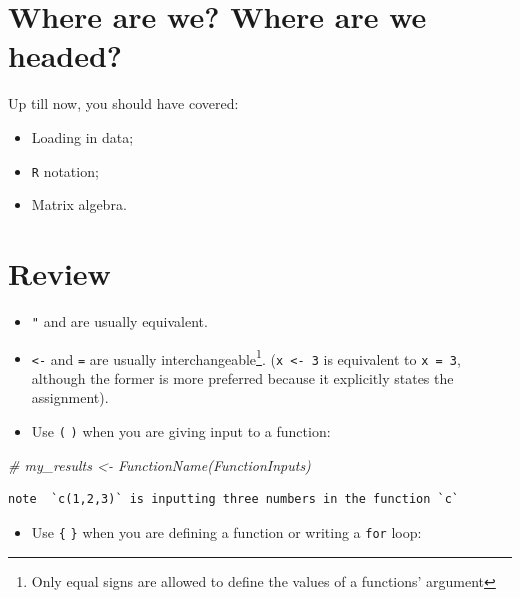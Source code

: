 \documentclass[
]{book}
\newenvironment{Shaded}{\begin{snugshade}}{\end{snugshade}}
\newcommand{\CommentTok}[1]{\textcolor[rgb]{0.56,0.35,0.01}{\textit{#1}}}
\providecommand{\tightlist}{%
  \setlength{\itemsep}{0pt}\setlength{\parskip}{0pt}}
\theoremstyle{definition}
\theoremstyle{definition}
\theoremstyle{definition}
\theoremstyle{remark}
\begin{document}
\hypertarget{where-are-we-where-are-we-headed-7}{%
\section*{Where are we? Where are we headed?}\label{where-are-we-where-are-we-headed-7}}

Up till now, you should have covered:

\begin{itemize}
\tightlist
\item
  Loading in data;
\item
  \texttt{R} notation;
\item
  Matrix algebra.
\end{itemize}

\hypertarget{review}{%
\section{Review}\label{review}}

\begin{itemize}
\tightlist
\item
  \texttt{"} and \texttt{\textquotesingle{}} are usually equivalent.
\item
  \texttt{\textless{}-} and \texttt{=} are usually interchangeable\footnote{Only equal signs are allowed to define the values of a functions' argument}. (\texttt{x\ \textless{}-\ 3} is equivalent to \texttt{x\ =\ 3}, although the former is more preferred because it explicitly states the assignment).
\item
  Use \texttt{(} \texttt{)} when you are giving input to a function:
\end{itemize}

\begin{Shaded}
\begin{Highlighting}[]
\CommentTok{\# my\_results <{-} FunctionName(FunctionInputs)}
\end{Highlighting}
\end{Shaded}

\begin{verbatim}
note  `c(1,2,3)` is inputting three numbers in the function `c`
\end{verbatim}

\begin{itemize}
\tightlist
\item
  Use \texttt{\{} \texttt{\}} when you are defining a function or writing a \texttt{for} loop:
\end{itemize}
\end{document}

